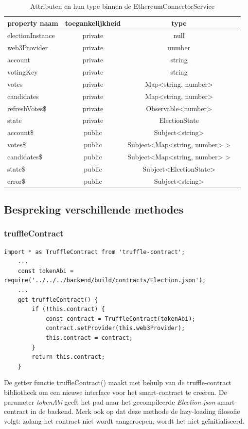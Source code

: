 	\begin{table}
		\centering
		\begin{tabular}{ |l|c|c|c| } 
			\hline
			\textbf{property naam} & \textbf{toegankelijkheid}&  \textbf{type}  \\
			\hline
			electionInstance 		& private & null \\ 
			web3Provider 			& private & number\\ 
			account 					  & private & string \\ 
			votingKey 					& private & string \\ 
			votes 							 & private & Map<string, number> \\ 
			candidates 					& private & Map<string, number>  \\ 
			refreshVotes\$ 			 & private & Observable<number>  \\ 
			state 							  & private & ElectionState  \\ 
			account\$  					& public & Subject<string> \\ 
			votes\$  					   & public & Subject<Map<string, number> > \\ 
			candidates\$ 			 & public & Subject<Map<string, number> > \\ 
			state\$ 						& public & Subject<ElectionState>  \\ 
			error\$ 						& public & Subject<string> \\ 
			\hline
		\end{tabular}
	\caption{Attributen en hun type binnen de EthereumConnectorService}
	\label{tab:ethservice}
\end{table}

\subsection{Bespreking verschillende methodes}
	\subsubsection{truffleContract}
	\lstset{language=JavaScriptSolidity} 
	\begin{lstlisting}[numbers=none]
	import * as TruffleContract from 'truffle-contract';
	...
	const tokenAbi = require('../../../backend/build/contracts/Election.json');
	...
	get truffleContract() {
		if (!this.contract) {
			const contract = TruffleContract(tokenAbi);
			contract.setProvider(this.web3Provider);
			this.contract = contract;
		}
		return this.contract;
	}
	\end{lstlisting}
	De getter functie truffleContract() maakt met behulp van de  truffle-contract bibliotheek om een nieuwe interface voor het smart-contract te creëren. De parameter \textit{tokenAbi} geeft het pad naar het gecompileerde \textit{Election.json} smart-contract in de backend. Merk ook op dat deze methode de lazy-loading filosofie volgt: zolang het contract niet wordt aangeroepen, wordt het niet geïnitialiseerd.
